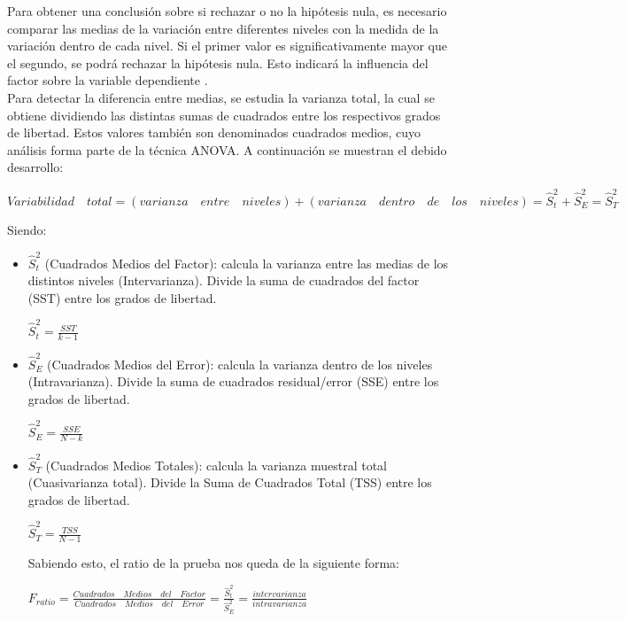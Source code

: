 Para obtener una conclusión sobre si rechazar o no la hipótesis nula, es necesario comparar las medias de la variación entre diferentes niveles con la medida de la variación dentro de cada nivel. Si el primer valor es significativamente mayor que el segundo, se podrá rechazar la hipótesis nula. Esto indicará la influencia del factor sobre la variable dependiente \cite{terradez2003analisis}.\\

Para detectar la diferencia entre medias, se estudia la varianza total, la cual se obtiene dividiendo las distintas sumas de cuadrados entre los respectivos grados de libertad. Estos valores también son denominados cuadrados medios, cuyo análisis forma parte de la técnica ANOVA. A continuación se muestran el debido desarrollo:
\begin{center}
$Variabilidad\quad total = (varianza\quad entre\quad niveles) + (varianza\quad dentro \quad de\quad los\quad niveles) = \hat{S}_{t}^{2} + \hat{S}_{E}^{2} = \hat{S}_{T}^{2}$
\end{center}

Siendo:
\begin{itemize}
	\item $\hat{S}_{t}^{2}$ (Cuadrados Medios del Factor): calcula la varianza entre las medias de los distintos niveles (Intervarianza). Divide la suma de cuadrados del factor (SST) entre los grados de libertad.
	\begin{center}
		$\hat{S}_{t}^{2} = \frac{SST}{k-1}$
	\end{center}
	\item $\hat{S}_{E}^{2}$ (Cuadrados Medios del Error): calcula la varianza dentro de los niveles (Intravarianza). Divide la suma de cuadrados residual/error (SSE) entre los grados de libertad.
	\begin{center}
		$\hat{S}_{E}^{2} = \frac{SSE}{N-k}$
	\end{center}
	\item $\hat{S}_{T}^{2}$ (Cuadrados Medios Totales): calcula la varianza muestral total (Cuasivarianza total). Divide la Suma de Cuadrados Total (TSS) entre los grados de libertad.
	\begin{center}
		$\hat{S}_{T}^{2} = \frac{TSS}{N-1}$
	\end{center}
	
	
	Sabiendo esto, el ratio de la prueba nos queda de la siguiente forma:
	\begin{center}
	$F_{ratio}=\frac{Cuadrados\quad Medios\quad del\quad Factor}{Cuadrados\quad Medios\quad del\quad Error}=\frac{\hat{S}_{t}^{2}}{\hat{S}_{E}^{2}}=\frac{intervarianza}{intravarianza}$
	\end{center}
\end{itemize}




